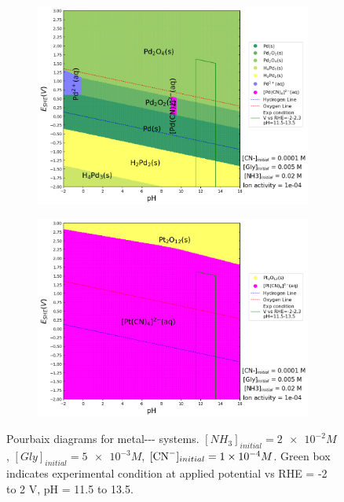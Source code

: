 \documentclass[journal=jacsat,manuscript=article]{achemso}
\begin{document}
\begin{figure}[htbp]
\begin{subfigure}[b]{0.3\textwidth}
    \end{subfigure}
    \begin{subfigure}[b]{0.3\textwidth}
        \includegraphics[width=\textwidth]{Figures/pourbaix_diagrams/Pd-NH3-H2O_activity=1e-04_[NH3]=0.02M_[Gly]=0.005M_[CN]=0.0001.png}
        \subcaption{}\label{fig:Pd_Pourbaix_CN_CH3_Gly}
    \end{subfigure}
    \begin{subfigure}[b]{0.3\textwidth}
        \includegraphics[width=\textwidth]{Figures/pourbaix_diagrams/Pt-NH3-H2O_activity=1e-04_[NH3]=0.02M_[Gly]=0.005M_[CN]=0.0001.png}
        \subcaption{}\label{fig:Pt_Pourbaix_CN_CH3_Gly}
    \end{subfigure}

    \caption{Pourbaix diagrams for metal--- systems. $[NH_3]_{initial}= \num{2e-2}M$, $[Gly]_{initial}=\num{5e-3}M$, $[\ce{CN-}]_{initial}=\num{1e-4}M$. Green box indicates experimental condition at applied potential vs RHE = -2 to 2 V, pH = 11.5 to 13.5.}
    \label{fig:Pourbaix_NH3_Gly}
\end{figure}
\end{document}
